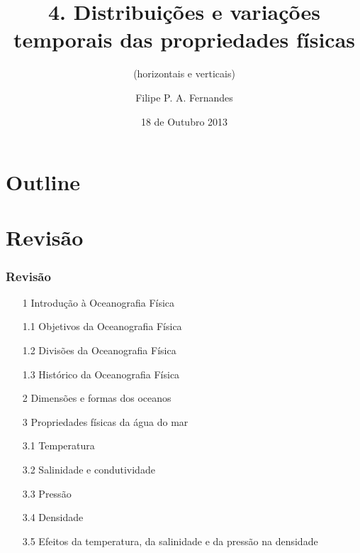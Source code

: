 \title[Aula 07]{4. Distribuições e variações temporais das propriedades físicas}
\subtitle{(horizontais e verticais)}
\author[Filipe Fernandes]{Filipe P. A. Fernandes}
\date[Outubro 2013]{18 de Outubro 2013}




\begin{frame}[plain]
  \titlepage
\end{frame}

\section*{Outline}
\begin{frame}
\tableofcontents
\end{frame}


\section{Revisão}
\begin{frame}
\frametitle{Revisão}
  \begin{itemize}[<+-| alert@+>]
    \item[1] Introdução à Oceanografia Física
    \item[1.1] Objetivos da Oceanografia Física
    \item[1.2] Divisões da Oceanografia Física
    \item[1.3] Histórico da Oceanografia Física
    \item[2] Dimensões e formas dos oceanos
    \item[3] Propriedades físicas da água do mar
    \item[3.1] Temperatura
    \item[3.2] Salinidade e condutividade
    \item[3.3] Pressão
    \item[3.4] Densidade
    \item[3.5] Efeitos da temperatura, da salinidade e da pressão na densidade
  \end{itemize}
\end{frame}


